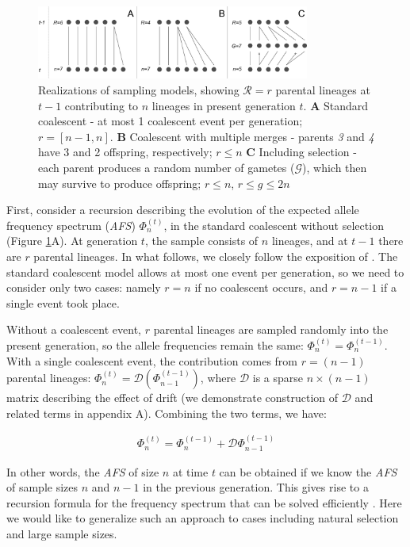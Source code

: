 \documentclass[review]{elsarticle}
\begin{document}
\begin{figure}[ht]
  \centering
  \includegraphics[width=0.8\textwidth]{fig/schematic.pdf}
  \caption{\label{fig:schematic} Realizations of sampling models, showing $\mathcal{R}=r$ parental
    lineages at $t-1$ contributing to $n$ lineages in present generation $t$. \textbf{A} Standard
    coalescent - at most 1 coalescent event per generation; $r=[n-1, n]$. \textbf{B} Coalescent with multiple
    merges - parents \textit{3} and \textit{4} have 3 and 2 offspring, respectively; $r \le n$ \textbf{C}
    Including selection - each parent produces a random number of gametes ($\mathcal{G}$), which
    then may survive to produce offspring; $r \le n$, $r \le g \le 2n$ }
\end{figure}

First, consider a recursion describing the evolution of the expected allele frequency spectrum
(\textit{AFS}) $\Phi_{n}^{(t)}$, in the standard coalescent without selection (Figure
\ref{fig:schematic}A). At generation $t$, the sample consists of $n$ lineages, and at $t-1$ there
are $r$ parental lineages. In what follows, we closely follow the exposition of
\cite{JouganousEtAl2017}. The standard coalescent model allows at most one event per generation, so
we need to consider only two cases: namely $r=n$ if no coalescent occurs, and $r=n-1$ if a single
event took place.

Without a coalescent event, $r$ parental lineages are sampled randomly into the present generation,
so the allele frequencies remain the same: $\Phi_{n}^{(t)}=\Phi_{n}^{(t-1)}$. With a single
coalescent event, the contribution comes from $r=(n-1)$ parental lineages:
$\Phi_{n}^{(t)}=\mathcal{D}(\Phi_{n-1}^{(t-1)})$, where $\mathcal{D}$ is a sparse $n \times (n-1)$
matrix describing the effect of drift (we demonstrate construction of $\mathcal{D}$ and related
terms in appendix A). Combining the two terms, we have:

\begin{align}
  \label{eq:op-neutral}
  \Phi_{n}^{(t)}=\Phi_{n}^{(t-1)}+\mathcal{D} \Phi_{n-1}^{(t-1)}
\end{align}

In other words, the \textit{AFS} of size $n$ at time $t$ can be obtained if we know the \textit{AFS}
of sample sizes $n$ and $n-1$ in the previous generation. This gives rise to a recursion formula for
the frequency spectrum that can be solved efficiently \cite{JouganousEtAl2017}. Here we would like
to generalize such an approach to cases including natural selection and large sample sizes.
\end{document}
